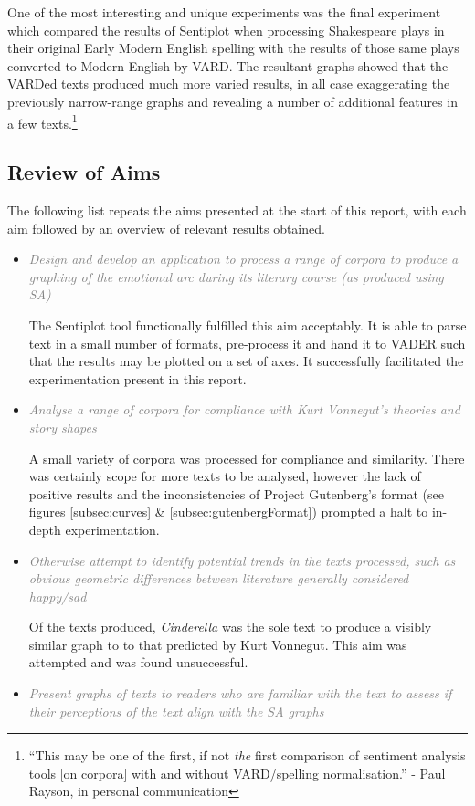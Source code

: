 \documentclass{article}
\begin{document}
{    One of the most interesting and unique experiments was the final experiment which compared the results of Sentiplot when processing Shakespeare plays in their original Early Modern English spelling with the results of those same plays converted to Modern English by VARD. The resultant graphs showed that the VARDed texts produced much more varied results, in all case exaggerating the previously narrow-range graphs and revealing a number of additional features in a few texts.\footnote{``This may be one of the first, if not \textit{the} first comparison of sentiment analysis tools [on corpora] with and without VARD/spelling normalisation.'' - Paul Rayson, in personal communication}
    \subsection{Review of Aims}
        The following list repeats the aims presented at the start of this report, with each aim followed by an overview of relevant results obtained.
        \begin{itemize}
            \item \textcolor{gray}{\textit{Design and develop an application to process a range of corpora to produce a graphing of the emotional arc during its literary course (as produced using SA)}}
            
            The Sentiplot tool functionally fulfilled this aim acceptably. It is able to parse text in a small number of formats, pre-process it and hand it to VADER such that the results may be plotted on a set of axes. It successfully facilitated the experimentation present in this report.

            \item \textcolor{gray}{\textit{Analyse a range of corpora for compliance with Kurt Vonnegut’s theories and story shapes}}
            
            A small variety of corpora was processed for compliance and similarity. There was certainly scope for more texts to be analysed, however the lack of positive results and the inconsistencies of Project Gutenberg's format (see figures \ref{subsec:curves} \& \ref{subsec:gutenbergFormat}) prompted a halt to in-depth experimentation.
            \item \textcolor{gray}{\textit{Otherwise attempt to identify potential trends in the texts processed, such as obvious geometric differences between literature generally considered happy/sad}}
            
            Of the texts produced, \textit{Cinderella} was the sole text to produce a visibly similar graph to to that predicted by Kurt Vonnegut. This aim was attempted and was found unsuccessful.
            \item \textcolor{gray}{\textit{Present graphs of texts to readers who are familiar with the text to assess if their perceptions of the text align with the SA graphs}}
            

\end{itemize}}
\end{document}
